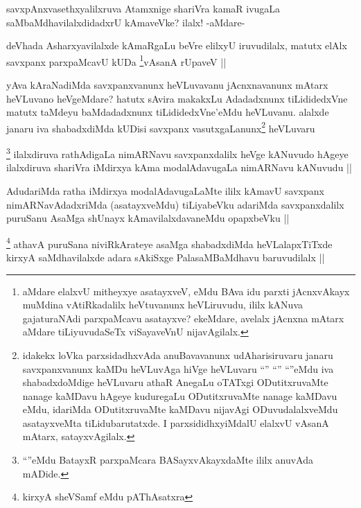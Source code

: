 \begin{artha}
savxpAnxvasethxyalilxruva Atamxnige shariVra kamaR ivugaLa saMbaMdhavilalxdidadxrU kAmaveVke? ilalx! -aMdare-
\end{artha}

\begin{artha}
deVhada Asharxyavilalxde kAmaRgaLu beVre elilxyU iruvudilalx, matutx elAlx savxpanx parxpaMcavU kUDa \footnote{aMdare elalxvU mitheyxye asatayxveV, eMdu BAva idu parxti jAcnxvAkayx muMdina vAtiRkadalilx heVtuvanunx heVLiruvudu, ililx kANuva gajaturaNAdi parxpaMcavu asatayxve? ekeMdare, avelalx jAcnxna mAtarx aMdare tiLiyuvudaSeTx viSayaveVnU nijavAgilalx.}vAsanA rUpaveV ||
\end{artha}


\begin{artha}
yAva kAraNadiMda savxpanxvanunx heVLuvavanu jAcnxnavanunx mAtarx heVLuvano heVgeMdare? hatutx sAvira makakxLu Adadadxnunx tiLididedxVne matutx taMdeyu baMdadadxnunx tiLididedxVne'eMdu heVLuvanu. alalxde janaru iva shabadxdiMda kUDisi savxpanx vasutxgaLanunx\footnote{idakekx loVka parxsidadhxvAda anuBavavanunx udAharisiruvaru janaru savxpanxvanunx kaMDu heVLuvAga hiVge heVLuvaru ``\stext'' ``\stext'' ``\stext''eMdu iva shabadxdoMdige heVLuvaru athaR AnegaLu oTATxgi ODutitxruvaMte nanage kaMDavu hAgeye kuduregaLu ODutitxruvaMte nanage kaMDavu eMdu, idariMda ODutitxruvaMte kaMDavu nijavAgi ODuvudalalxveMdu asatayxveMta tiLidubarutatxde. I parxsididhxyiMdalU elalxvU vAsanA mAtarx, satayxvAgilalx.} heVLuvaru
\end{artha}

\begin{artha}
\footnote{``\stext''eMdu BatayxR parxpaMcara BASayxvAkayxdaMte ililx anuvAda mADide.}
ilalxdiruva rathAdigaLa nimARNavu savxpanxdalilx heVge kANuvudo
hAgeye ilalxdiruva shariVra iMdirxya kAma modalAdavugaLa nimARNavu kANuvudu ||
\end{artha}

\begin{artha}
AdudariMda ratha iMdirxya modalAdavugaLaMte ililx kAmavU savxpanx nimARNavAdadxriMda (asatayxveMdu) tiLiyabeVku adariMda savxpanxdalilx puruSanu AsaMga shUnayx kAmavilalxdavaneMdu opapxbeVku ||
\end{artha}

\begin{artha}
\footnote{kirxyA sheVSamf eMdu pAThAsatxra}
athavA puruSana niviRkArateye asaMga shabadxdiMda heVLalapxTiTxde kirxyA saMdhavilalxde adara sAkiSxge PalasaMBaMdhavu baruvudilalx ||
\end{artha}

